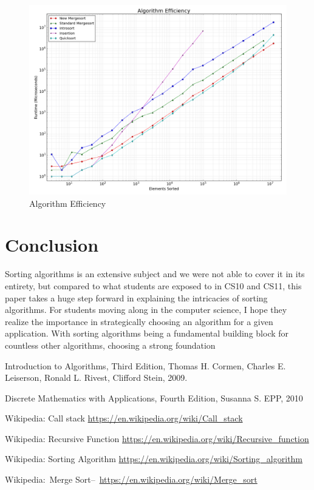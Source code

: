 \documentclass[12pt]{article}
\begin{document}
	\begin{figure}[H]
		\centering
		\includegraphics[width=6in]{figure_3.png}
		\caption{Algorithm Efficiency}
		\label{fig:algeff}
	\end{figure}
	
\section{Conclusion}

Sorting algorithms is an extensive subject and we were not able to cover it in its entirety, but compared to what students are exposed to in CS10 and CS11, this paper takes a huge step forward in explaining the intricacies of sorting algorithms.
For students moving along in the computer science, I hope they realize the importance in strategically choosing an algorithm for a given application. 
With sorting algorithms being a fundamental building block for countless other algorithms, choosing a strong foundation 



\pagebreak

\begin{thebibliography}{9}
	Introduction to Algorithms, Third Edition,
	Thomas H. Cormen, Charles E. Leiserson, Ronald L. Rivest, Clifford Stein,
	2009.
	
	
	Discrete Mathematics with Applications, Fourth Edition,
	Susanna S. EPP,
	2010
	
	
	Wikipedia: Call stack \url{https://en.wikipedia.org/wiki/Call_stack}
	
	Wikipedia: Recursive Function \url{https://en.wikipedia.org/wiki/Recursive_function}
	
	Wikipedia: Sorting Algorithm \url{https://en.wikipedia.org/wiki/Sorting_algorithm}
	
	Wikipedia:~Merge Sort–~\url{https://en.wikipedia.org/wiki/Merge_sort}
		
\end{thebibliography}
\end{document}
